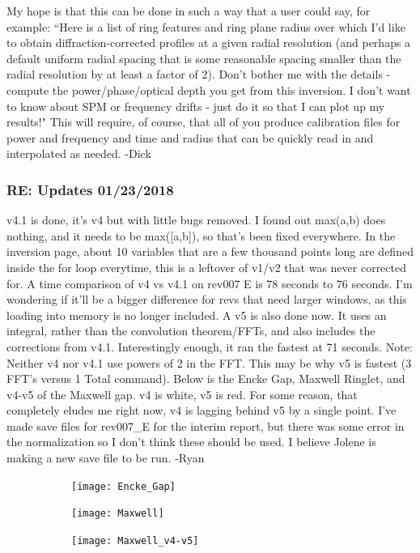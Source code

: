 \documentclass[crop=false,class=article,oneside]{standalone}
\begin{document}
My hope is that this can be done in such a way that a user could say, for example: ``Here is a list of ring features and ring plane radius over which I'd like to obtain diffraction-corrected profiles at a given radial resolution (and perhaps a default uniform radial spacing that is some reasonable spacing smaller than the radial resolution by at least a factor of 2). Don't bother me with the details - compute the power/phase/optical depth you get from this inversion. I don't want to know about SPM or frequency drifts - just do it so that I can plot up my results!" This will require, of course, that all of you produce calibration files for power and frequency and time and radius that can be quickly read in and interpolated as needed. -Dick
\subsubsection{\footnotesize RE: Updates 01/23/2018}
v4.1 is done, it's v4 but with little bugs removed. I found out max(a,b) does nothing, and it needs to be max([a,b]), so that's been fixed everywhere. In the inversion page, about 10 variables that are a few thousand points long are defined inside the for loop everytime, this is a leftover of v1/v2 that was never corrected for. A time comparison of v4 vs v4.1 on rev007 E is 78 seconds to 76 seconds. I'm wondering if it'll be a bigger difference for revs that need larger windows, as this loading into memory is no longer included. A v5 is also done now. It uses an integral, rather than the convolution theorem/FFTs, and also includes the corrections from v4.1. Interestingly enough, it ran the fastest at 71 seconds. Note: Neither v4 nor v4.1 use powers of 2 in the FFT. This may be why v5 is fastest (3 FFT's versus 1 Total command). Below is the Encke Gap, Maxwell Ringlet, and v4-v5 of the Maxwell gap. v4 is white, v5 is red. For some reason, that completely eludes me right now, v4 is lagging behind v5 by a single point. I've made save files for rev007\_E for the interim report, but there was some error in the normalization so I don't think these should be used. I believe Jolene is making a new save file to be run. -Ryan
\begin{figure}[H]
    \centering
    \begin{subfigure}[b]{0.32\textwidth}
        \texttt{[image: Encke\_Gap]}
    \end{subfigure}
    \begin{subfigure}[b]{0.32\textwidth}
        \texttt{[image: Maxwell]}
    \end{subfigure}
    \begin{subfigure}[b]{0.32\textwidth}
        \texttt{[image: Maxwell\_v4-v5]}
    \end{subfigure}
\end{figure}
\end{document}
